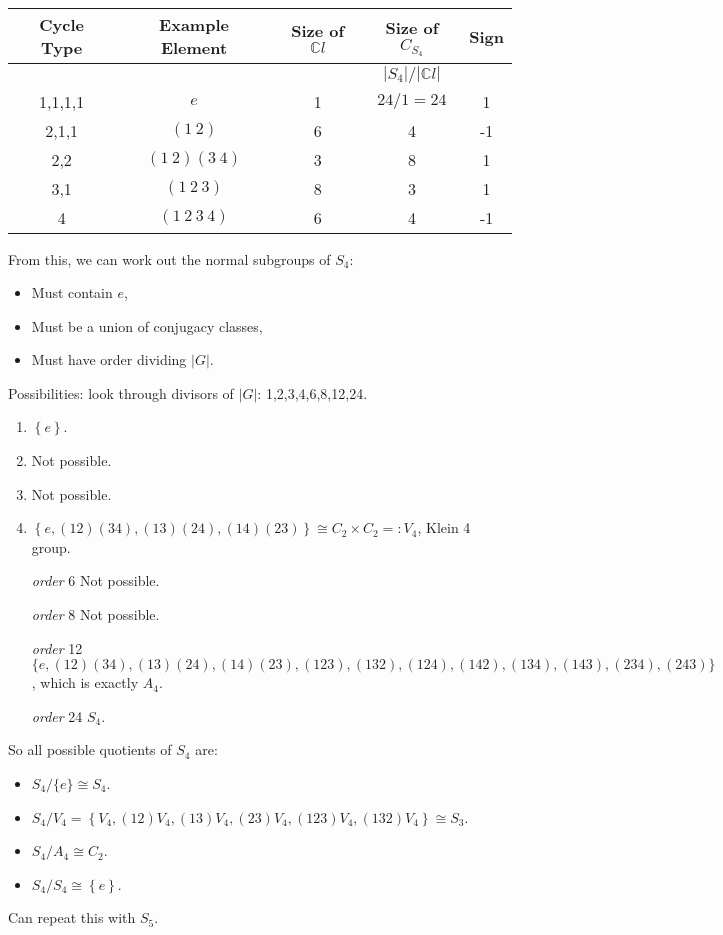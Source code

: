 \documentclass[a4paper]{article}
\newcommand{\redcomment}[1]{{\color{red}#1}}
\begin{document}
      \begin{example}
        \begin{center}
            \begin{tabular}{c|c|c|c|c}
                Cycle Type & Example Element & Size of $\mathbb{C}l$ & Size of $C_{S_4}$ & Sign \\
                \hline 
                & & & \redcomment{$ |S_4|/|\mathbb{C}l| $} & \\
                1,1,1,1 & $e$ & 1 & $24/1=24$ &1 \\
                2,1,1 & $(1\ 2)$ & 6 & 4 &-1 \\
                2,2 & $(1\ 2)(3\ 4)$ & 3 & 8 &1 \\
                3,1 & $(1\ 2\ 3)$ & 8 & 3 &1 \\
                4 & $(1\ 2\ 3\ 4)$ & 6 & 4 &-1 \\
            \end{tabular}
        \end{center}
        From this, we can work out the normal subgroups of $S_4$:
        \begin{itemize}
            \item Must contain $e$,
            \item Must be a union of conjugacy classes,
            \item Must have order dividing $|G|$.
        \end{itemize}
        Possibilities: look through divisors of $|G|$: 1,2,3,4,6,8,12,24.
        \begin{enumerate}[align=left, label=\textit{order} \arabic*]
            \item $ \left\{ e \right\} $.
            \item Not possible.
            \item Not possible.
            \item $ \left\{ e,(12)(34),(13)(24),(14)(23) \right\} \cong C_2 \times C_2=:V_4 $, Klein 4 group.
            \item[\textit{order} 6] Not possible.
            \item[\textit{order} 8] Not possible.
            \item[\textit{order} 12] $ \{e,(12)(34),(13)(24),(14)(23), (123), (132),(124),(142),(134),(143),(234),(243)\}$, which is exactly $A_4$.
            \item[\textit{order} 24] $S_4$. 
        \end{enumerate}
        So all possible quotients of $S_4$ are:
        \begin{itemize}
            \item $ S_4/\{e\}\cong S_4 $.
            \item $ S_4/V_4 = \left\{ V_4,(12)V_4,(13)V_4,(23)V_4,(123)V_4,(132)V_4 \right\} \cong S_3 $.
            \item $ S_4/A_4 \cong C_2 $.
            \item $ S_4/S_4 \cong \left\{ e \right\} $.
        \end{itemize}
        Can repeat this with $S_5$.
      \end{example}
\end{document}
